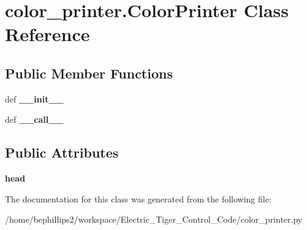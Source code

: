 \hypertarget{classcolor__printer_1_1_color_printer}{\section{color\-\_\-printer.\-Color\-Printer Class Reference}
\label{classcolor__printer_1_1_color_printer}
}
\subsection*{Public Member Functions}
\begin{DoxyCompactItemize}
\item 
\hypertarget{classcolor__printer_1_1_color_printer_a74f2b2ef4f1211d193bd5474098a7cee}{def {\bfseries \-\_\-\-\_\-init\-\_\-\-\_\-}}\label{classcolor__printer_1_1_color_printer_a74f2b2ef4f1211d193bd5474098a7cee}

\item 
\hypertarget{classcolor__printer_1_1_color_printer_acd3a518f898ebc3ad122b7d15d97f656}{def {\bfseries \-\_\-\-\_\-call\-\_\-\-\_\-}}\label{classcolor__printer_1_1_color_printer_acd3a518f898ebc3ad122b7d15d97f656}

\end{DoxyCompactItemize}
\subsection*{Public Attributes}
\begin{DoxyCompactItemize}
\item 
\hypertarget{classcolor__printer_1_1_color_printer_a263db729cb9e2df87bcbc8c3bc41e052}{{\bfseries head}}\label{classcolor__printer_1_1_color_printer_a263db729cb9e2df87bcbc8c3bc41e052}

\end{DoxyCompactItemize}


The documentation for this class was generated from the following file\-:\begin{DoxyCompactItemize}
\item 
/home/bephillips2/workspace/\-Electric\-\_\-\-Tiger\-\_\-\-Control\-\_\-\-Code/color\-\_\-printer.\-py\end{DoxyCompactItemize}

